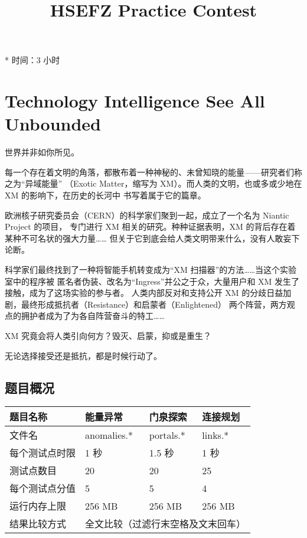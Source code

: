 \documentclass[UTF8, 11pt, a4paper]{article}
\begin{document}
\title{HSEFZ Practice Contest}
\maketitle

* 时间：3 小时
\newpage

\section*{Technology Intelligence See All Unbounded}

世界并非如你所见。

每一个存在着文明的角落，都散布着一种神秘的、未曾知晓的能量——研究者们称之为“异域能量”%
（Exotic Matter，缩写为 XM）。而人类的文明，也或多或少地在 XM 的影响下，在历史的长河中%
书写着属于它的篇章。

欧洲核子研究委员会（CERN）的科学家们聚到一起，成立了一个名为 Niantic Project 的项目，%
专门进行 XM 相关的研究。种种证据表明，XM 的背后存在着某种不可名状的强大力量……%
但关于它到底会给人类文明带来什么，没有人敢妄下论断。

科学家们最终找到了一种将智能手机转变成为“XM 扫描器”的方法……当这个实验室中的程序被%
匿名者伪装、改名为“Ingress”并公之于众，大量用户和 XM 发生了接触，成为了这场实验的参与者。%
人类内部反对和支持公开 XM 的分歧日益加剧，最终形成抵抗者（Resistance）和启蒙者（Enlightened）%
两个阵营，两方观点的拥护者成为了为各自阵营奋斗的特工……

XM 究竟会将人类引向何方？毁灭、启蒙，抑或是重生？

无论选择接受还是抵抗，都是时候行动了。
\newline\newline

\subsection*{题目概况}
\begin{tabularx}{\textwidth}{|X|X|X|X|}
\hline
题目名称 & 能量异常 & 门泉探索 & 连接规划 \\ \hline
文件名 & anomalies.* & portals.* & links.* \\ \hline
每个测试点时限 & 1 秒 & 1.5 秒 & 1 秒 \\ \hline
测试点数目 & 20 & 20 & 25 \\ \hline
每个测试点分值 & 5 & 5 & 4 \\ \hline
运行内存上限 & 256 MB & 256 MB & 256 MB \\ \hline
结果比较方式 & \multicolumn{3}{c|}{全文比较（过滤行末空格及文末回车）} \\ \hline
\end{tabularx}
\end{document}
